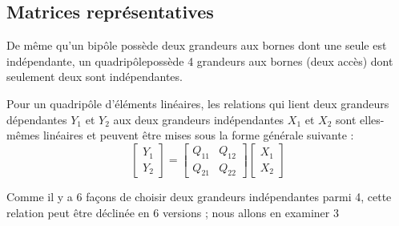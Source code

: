 \documentclass[12pt,a4paper]{article}
\begin{document}
\subsection{Matrices représentatives}
De même qu'un bipôle possède deux grandeurs aux bornes dont une seule est indépendante, un quadripôlepossède 4 grandeurs aux bornes (deux accès) dont seulement deux sont indépendantes. 

Pour un quadripôle d'éléments linéaires, les relations qui lient deux grandeurs dépendantes $Y_1$ et $Y_2$ aux deux grandeurs indépendantes $X_1$ et $X_2$ sont elles-mêmes linéaires et peuvent être mises sous la forme générale suivante :
\begin{equation}
	\begin{bmatrix}
	Y_1\\
	Y_2
	\end{bmatrix} = 
	\begin{bmatrix}
		Q_{11} & Q_{12}\\
		Q_{21} & Q_{22}
	\end{bmatrix} \begin{bmatrix}
	X_1\\
	X_2
	\end{bmatrix}
\end{equation}
\begin{blackbox}
	Comme il y a 6 façons de choisir deux grandeurs indépendantes parmi 4, cette relation peut être déclinée en 6 versions ; nous allons en examiner 3
\end{blackbox}
\end{document}
